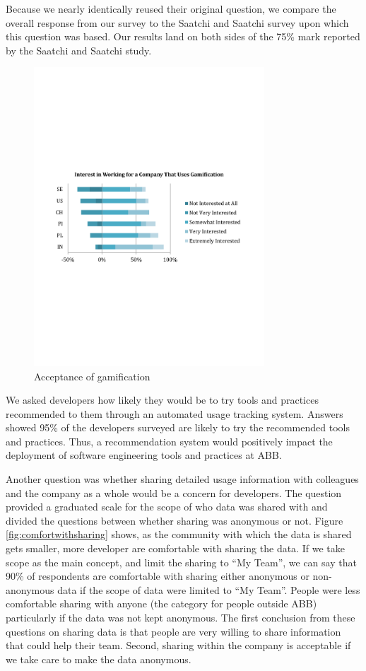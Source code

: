 \documentclass{sig-alternate}
\begin{document}
Because we nearly identically reused their original question, we compare the overall response from our survey to the Saatchi and Saatchi survey\cite{wbsnipes:SaatchiGameification} upon which this question was based.  Our results land on both sides of the 75\% mark reported by the Saatchi and Saatchi study.  

\begin{figure}
	\includegraphics[width=3.4in]{gamificationquestion.pdf}
	\caption{Acceptance of gamification}
	\label{fig:gamification}
\end{figure}

We asked developers how likely they would be to try tools and practices recommended to them through an automated usage tracking system.  Answers showed 95\% of the developers surveyed are likely to try the recommended tools and practices.  Thus, a recommendation system would positively impact the deployment of software engineering tools and practices at ABB.

Another question was whether sharing detailed usage information with colleagues and the company as a whole would be a concern for developers.  The question provided a graduated scale for the scope of who data was shared with and divided the questions between whether sharing was anonymous or not. Figure \ref{fig:comfortwithsharing}  shows, as the community with which the data is shared gets smaller, more developer are comfortable with sharing the data.  If we take scope as the main concept, and limit the sharing to ``My Team'', we can say that 90\% of respondents are comfortable with sharing either anonymous or non-anonymous data if the scope of data were limited to ``My Team''.  People were less comfortable sharing with anyone (the category for people outside ABB) particularly if the data was not kept anonymous.  
The first conclusion from these questions on sharing data is that people are very willing to share information that could help their team. Second, sharing within the company is acceptable if we take care to make the data anonymous.
\end{document}
